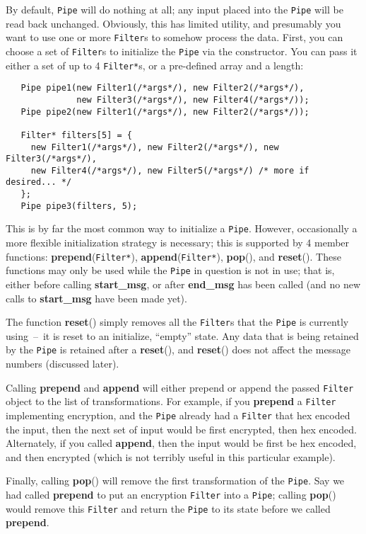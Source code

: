 \documentclass{article}
\newcommand{\function}[1]{\textbf{#1}}
\newcommand{\type}[1]{\texttt{#1}}
\begin{document}
By default, \type{Pipe} will do nothing at all; any input placed into
the \type{Pipe} will be read back unchanged. Obviously, this has
limited utility, and presumably you want to use one or more
\type{Filter}s to somehow process the data. First, you can choose a
set of \type{Filter}s to initialize the \type{Pipe} via the
constructor. You can pass it either a set of up to 4 \type{Filter*}s,
or a pre-defined array and a length:

\begin{verbatim}
   Pipe pipe1(new Filter1(/*args*/), new Filter2(/*args*/),
              new Filter3(/*args*/), new Filter4(/*args*/));
   Pipe pipe2(new Filter1(/*args*/), new Filter2(/*args*/));

   Filter* filters[5] = {
     new Filter1(/*args*/), new Filter2(/*args*/), new Filter3(/*args*/),
     new Filter4(/*args*/), new Filter5(/*args*/) /* more if desired... */
   };
   Pipe pipe3(filters, 5);
\end{verbatim}

This is by far the most common way to initialize a \type{Pipe}. However,
occasionally a more flexible initialization strategy is necessary; this is
supported by 4 member functions: \function{prepend}(\type{Filter*}),
\function{append}(\type{Filter*}), \function{pop}(), and \function{reset}().
These functions may only be used while the \type{Pipe} in question is not in
use; that is, either before calling \function{start\_msg}, or after
\function{end\_msg} has been called (and no new calls to \function{start\_msg}
have been made yet).

The function \function{reset}() simply removes all the \type{Filter}s
that the \type{Pipe} is currently using~--~it is reset to an
initialize, ``empty'' state.  Any data that is being retained by the
\type{Pipe} is retained after a \function{reset}(), and
\function{reset}() does not affect the message numbers (discussed
later).

Calling \function{prepend} and \function{append} will either prepend
or append the passed \type{Filter} object to the list of
transformations. For example, if you \function{prepend} a
\type{Filter} implementing encryption, and the \type{Pipe} already had
a \type{Filter} that hex encoded the input, then the next set of
input would be first encrypted, then hex encoded. Alternately, if you
called \function{append}, then the input would be first be hex
encoded, and then encrypted (which is not terribly useful in this
particular example).

Finally, calling \function{pop}() will remove the first transformation
of the \type{Pipe}. Say we had called \function{prepend} to put an
encryption \type{Filter} into a \type{Pipe}; calling \function{pop}()
would remove this \type{Filter} and return the \type{Pipe} to its
state before we called \function{prepend}.
\end{document}
